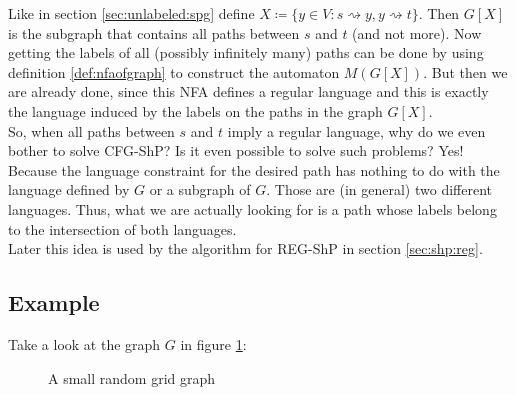 \documentclass[]{article}
\numberwithin{equation}{section}
\begin{document}
Like in section \ref{sec:unlabeled:spg} define $X \coloneqq \{y \in V: s \rightsquigarrow y, y \rightsquigarrow t\}$. Then $G[X]$ is the subgraph that contains all paths between $s$ and $t$ (and not more). Now getting the labels of all (possibly infinitely many) paths can be done by using definition \ref{def:nfaofgraph} to construct the automaton $M(G[X])$. But then we are already done, since this NFA defines a regular language and this is exactly the language induced by the labels on the paths in the graph $G[X]$.\\

So, when all paths between $s$ and $t$ imply a regular language, why do we even bother to solve CFG-ShP? Is it even possible to solve such problems? Yes! Because the language constraint for the desired path has nothing to do with the language defined by $G$ or a subgraph of $G$. Those are (in general) two different languages. Thus, what we are actually looking for is a path whose labels belong to the intersection of both languages.\\
Later this idea is used by the algorithm for REG-ShP in section \ref{sec:shp:reg}.

\subsection{Example}
\label{sec:shp:example}

Take a look at the graph $G$ in figure \ref{fig:regexample}:

\begin{figure}[H]
	\centering
	\caption{A small random grid graph}
	\label{fig:regexample}
\end{figure}
\end{document}
